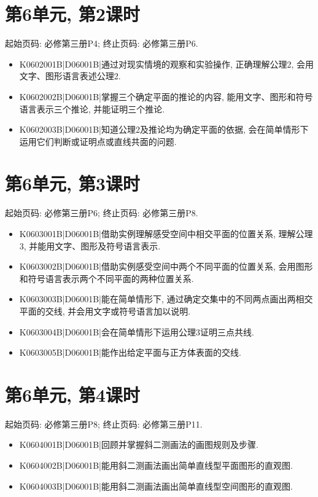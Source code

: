 \section*{第6单元, 第2课时}
起始页码: 必修第三册P4; 终止页码: 必修第三册P6.
\begin{itemize}
\item K0602001B|D06001B|通过对现实情境的观察和实验操作, 正确理解公理2, 会用文字、图形语言表述公理2.
\item K0602002B|D06001B|掌握三个确定平面的推论的内容, 能用文字、图形和符号语言表示三个推论, 并能证明三个推论.
\item K0602003B|D06001B|知道公理2及推论均为确定平面的依据, 会在简单情形下运用它们判断或证明点或直线共面的问题.
\end{itemize}

\section*{第6单元, 第3课时}
起始页码: 必修第三册P6; 终止页码: 必修第三册P8.
\begin{itemize}
\item K0603001B|D06001B|借助实例理解感受空间中相交平面的位置关系, 理解公理3, 并能用文字、图形及符号语言表示.
\item K0603002B|D06001B|借助实例感受空间中两个不同平面的位置关系, 会用图形和符号语言表示两个不同平面的两种位置关系.
\item K0603003B|D06001B|能在简单情形下, 通过确定交集中的不同两点画出两相交平面的交线, 并会用文字或符号语言加以说明.
\item K0603004B|D06001B|会在简单情形下运用公理3证明三点共线.
\item K0603005B|D06001B|能作出给定平面与正方体表面的交线.
\end{itemize}

\section*{第6单元, 第4课时}
起始页码: 必修第三册P8; 终止页码: 必修第三册P11.
\begin{itemize}
\item K0604001B|D06001B|回顾并掌握斜二测画法的画图规则及步骤.
\item K0604002B|D06001B|能用斜二测画法画出简单直线型平面图形的直观图.
\item K0604003B|D06001B|能用斜二测画法画出简单直线型空间图形的直观图.
\end{itemize}

